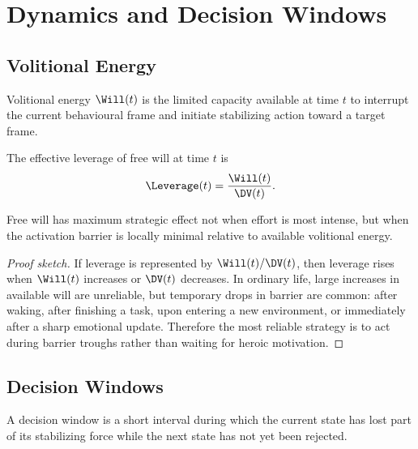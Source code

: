 \chapter{Dynamics and Decision Windows}
\label{ch:dynamics}

\section{Volitional Energy}

\begin{definition}
Volitional energy $\Will(t)$ is the limited capacity available at time $t$ to
interrupt the current behavioural frame and initiate stabilizing action toward
a target frame.
\end{definition}

\begin{definition}[Leverage]
The effective leverage of free will at time $t$ is
\[
  \Leverage(t) = \frac{\Will(t)}{\DV(t)}.
\]
\end{definition}

\begin{theorem}
Free will has maximum strategic effect not when effort is most intense, but
when the activation barrier is locally minimal relative to available
volitional energy.
\end{theorem}

\begin{proof}[Proof sketch]
If leverage is represented by $\Will(t)/\DV(t)$, then leverage rises when
$\Will(t)$ increases or $\DV(t)$ decreases. In ordinary life, large increases
in available will are unreliable, but temporary drops in barrier are common:
after waking, after finishing a task, upon entering a new environment, or
immediately after a sharp emotional update. Therefore the most reliable
strategy is to act during barrier troughs rather than waiting for heroic
motivation.
\end{proof}

\section{Decision Windows}

\begin{definition}
A decision window is a short interval during which the current state has lost
part of its stabilizing force while the next state has not yet been rejected.
\end{definition}

